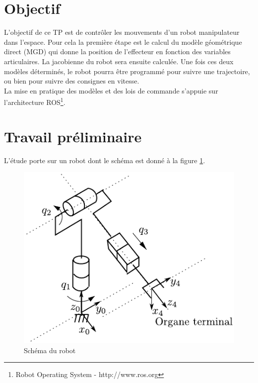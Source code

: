 \documentclass[12pt,a4paper]{article}
\begin{document}
\graphicspath{{figs/}}



\vspace{1cm}
\begin{center}
\end{center}
\medskip

\section{Objectif} 

\hspace{12pt} L'objectif de ce TP est de contrôler les mouvements d'un robot manipulateur dans l'espace. Pour cela la première étape est le calcul du modèle géométrique direct (MGD) qui donne la position de l'effecteur en fonction des variables articulaires. 
La jacobienne du robot sera ensuite calculée. Une fois ces deux modèles déterminés, le robot pourra être programmé pour suivre une trajectoire, ou bien pour suivre des consignes en vitesse.\\ 

La mise en pratique des modèles et des lois de commande s'appuie sur l'architecture ROS\footnote{ Robot Operating System - http://www.ros.org}. 

\section{Travail préliminaire}

\medskip L'étude porte sur un robot dont le schéma est donné  à la figure
\ref{fig:2RP}. 
\begin{figure}[h]
  \centering
  \includegraphics[width=.5\linewidth]{figs/fig-tourelle.pdf}
  \caption{Schéma du robot}
  \label{fig:2RP}
\end{figure}

\vspace*{2cm}
\end{document}
